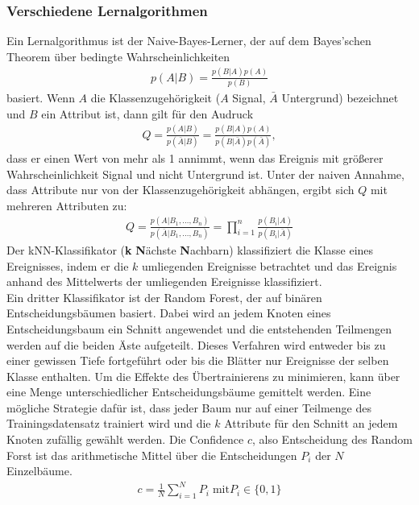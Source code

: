 \subsubsection{Verschiedene Lernalgorithmen}
Ein Lernalgorithmus ist der Naive-Bayes-Lerner, der auf dem Bayes'schen Theorem über bedingte Wahrscheinlichkeiten
\begin{align}
	p(A|B) = \frac{p(B|A)p(A)}{p(B)}
\end{align}
basiert. Wenn $A$ die Klassenzugehörigkeit ($A$ Signal, $\bar{A}$ Untergrund) bezeichnet und $B$ ein Attribut ist, dann gilt für den Audruck
\begin{align}
	Q = \frac{p(A|B)}{p(\bar{A}|B)} = \frac{p(B|A)p(A)}{p(B|\bar{A})p(\bar{A})},
\end{align}
dass er einen Wert von mehr als 1 annimmt, wenn das Ereignis mit größerer Wahrscheinlichkeit Signal und nicht Untergrund ist. Unter der naiven Annahme, dass Attribute nur von der Klassenzugehörigkeit abhängen, ergibt sich $Q$ mit mehreren Attributen zu:\\
\begin{align}
	Q = \frac{p(A|B_{1},...,B_{n})}{p(\bar{A}|B_{1},...,B_{n})} = \prod_{i=1}^{n} \frac{p(B_{i}|A)}{p(B_{i}|\bar{A})}
\end{align}
Der kNN-Klassifikator (\textbf{k} \textbf{N}ächste \textbf{N}achbarn) klassifiziert die Klasse eines Ereignisses, indem er die $k$ umliegenden Ereignisse betrachtet und das Ereignis anhand des Mittelwerts der umliegenden Ereignisse klassifiziert.\\
Ein dritter Klassifikator ist der Random Forest, der auf binären Entscheidungsbäumen basiert. Dabei wird an jedem Knoten eines Entscheidungsbaum ein Schnitt angewendet und die entstehenden Teilmengen werden auf die beiden Äste aufgeteilt. Dieses Verfahren wird entweder bis zu einer gewissen Tiefe fortgeführt oder bis die Blätter nur Ereignisse der selben Klasse enthalten.
Um die Effekte des Übertrainierens zu minimieren, kann über eine Menge unterschiedlicher Entscheidungsbäume gemittelt werden. Eine mögliche Strategie dafür ist, dass jeder Baum nur auf einer Teilmenge des Trainingsdatensatz trainiert wird und die $k$ Attribute für den Schnitt an jedem Knoten zufällig gewählt werden. Die Confidence $c$, also Entscheidung des Random Forst ist das arithmetische Mittel über die Entscheidungen $P_{i}$ der $N$ Einzelbäume.
\begin{align}
	c = \frac{1}{N} \sum_{i=1}^{N}P_{i} \; \text{mit} P_{i} \in \{0,1\}
\end{align}

